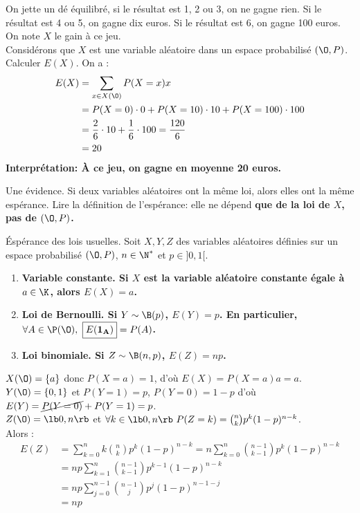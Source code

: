 \documentclass[11pt]{article}
\begin{document}
\begin{ex}{}{}
    On jette un dé équilibré, si le résultat est 1, 2 ou 3, on ne gagne rien. Si le résultat est 4 ou 5, on gagne dix euros. Si le résultat est 6, on gagne 100 euros. On note $X$ le gain à ce jeu.\\
    Considérons que $X$ est une variable aléatoire dans un espace probabilisé $(\O,P)$. Calculer $E(X)$.
    \tcblower
    On a :
    \begin{align*}
        E(X) &= \sum_{x\in X(\O)}P(X=x)x \\
             &= P(X=0)\cdot 0 + P(X=10)\cdot10 + P(X=100)\cdot100 \\
             &= \frac{2}{6}\cdot10 + \frac{1}{6}\cdot100 = \frac{120}{6}\\
             &= 20
    \end{align*}
    \bf{Interprétation:} À ce jeu, on gagne en moyenne 20 euros.
\end{ex}

\begin{prop}{Une évidence.}{}
    Si deux variables aléatoires ont la même loi, alors elles ont la même espérance.
    \tcblower
    Lire la définition de l'espérance: elle ne dépend \bf{que} de la loi de $X$, pas de $(\O, P)$.
\end{prop}

\pagebreak

\begin{prop}{Éspérance des lois usuelles.}{}
    Soit $X, Y, Z$ des variables aléatoires définies sur un espace probabilisé $(\O, P)$, $n\in\N^*$ et $p\in]0,1[$.
    \begin{enumerate}[topsep=0pt,itemsep=-0.5 ex]
        \item \bf{Variable constante.} Si $X$ est la variable aléatoire constante égale à $a\in\K$, alors $\boxed{E(X)=a}$.
        \item \bf{Loi de Bernoulli.} Si $Y\sim\B(p)$, $\boxed{E(Y)=p}$. En particulier, $\forall A \in \P(\O), ~ \boxed{E(\bf{1}_A)}=P(A)$.
        \item \bf{Loi binomiale.} Si $Z\sim\B(n,p)$, $\boxed{E(Z)=np}$.
    \end{enumerate}
    \tcblower
     $X(\O)=\{a\}$ donc $P(X=a)=1$, d'où $E(X)=P(X=a)a=a$.\\
     $Y(\O)=\{0,1\}$ et $P(Y=1)=p$, $P(Y=0)=1-p$ d'où $E(Y)=\cancel{P(Y=0)} + P(Y=1)=p$.\\
     $Z(\O)=\lb0,n\rb$ et $\forall k\in\lb0,n\rb ~ P(Z=k)=\binom{n}{k}p^k(1-p)^{n-k}$.\\
    Alors :
    \begin{align*}
        E(Z)&=\sum_{k=0}^nk\binom{n}{k}p^k(1-p)^{n-k}=n\sum_{k=0}^n\binom{n-1}{k-1}p^k(1-p)^{n-k}\\
            &=np\sum_{k=1}^n\binom{n-1}{k-1}p^{k-1}(1-p)^{n-k}\\
            &=np\sum_{j=0}^{n-1}\binom{n-1}{j}p^j(1-p)^{n-1-j}\\
            &=np
    \end{align*}
\end{prop}
\end{document}

